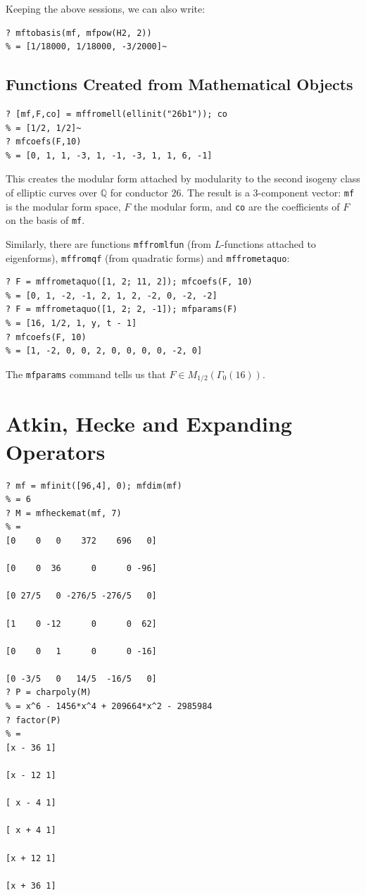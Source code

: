 \documentclass[11pt]{article}
\newcommand{\Q}{{\mathbb Q}}
\newcommand{\G}{\Gamma}
\def\kbd#1{{\tt #1}}
\begin{document}
  Keeping the above sessions, we can also write:

\begin{verbatim}
? mftobasis(mf, mfpow(H2, 2))
% = [1/18000, 1/18000, -3/2000]~
\end{verbatim}

\subsection{Functions Created from Mathematical Objects}

\begin{verbatim}
? [mf,F,co] = mffromell(ellinit("26b1")); co
% = [1/2, 1/2]~
? mfcoefs(F,10)
% = [0, 1, 1, -3, 1, -1, -3, 1, 1, 6, -1]
\end{verbatim}

This creates the modular form attached by modularity to the second isogeny
class of elliptic curves over $\Q$ for conductor $26$. The result is a
3-component vector: \kbd{mf} is the modular form space, $F$ the modular form,
and \kbd{co} are the coefficients of $F$ on the basis of \kbd{mf}.

Similarly, there are functions \kbd{mffromlfun} (from $L$-functions attached
to eigenforms), \kbd{mffromqf} (from quadratic forms) and \kbd{mffrometaquo}:

\begin{verbatim}
? F = mffrometaquo([1, 2; 11, 2]); mfcoefs(F, 10)
% = [0, 1, -2, -1, 2, 1, 2, -2, 0, -2, -2]
? F = mffrometaquo([1, 2; 2, -1]); mfparams(F)
% = [16, 1/2, 1, y, t - 1]
? mfcoefs(F, 10)
% = [1, -2, 0, 0, 2, 0, 0, 0, 0, -2, 0]
\end{verbatim}

The \kbd{mfparams} command tells us that $F\in M_{1/2}(\G_0(16))$.

\section{Atkin, Hecke and Expanding Operators}

\begin{verbatim}
? mf = mfinit([96,4], 0); mfdim(mf)
% = 6
? M = mfheckemat(mf, 7)
% =
[0    0   0    372    696   0]

[0    0  36      0      0 -96]

[0 27/5   0 -276/5 -276/5   0]

[1    0 -12      0      0  62]

[0    0   1      0      0 -16]

[0 -3/5   0   14/5  -16/5   0]
? P = charpoly(M)
% = x^6 - 1456*x^4 + 209664*x^2 - 2985984
? factor(P)
% =
[x - 36 1]

[x - 12 1]

[ x - 4 1]

[ x + 4 1]

[x + 12 1]

[x + 36 1]
\end{verbatim}
\end{document}
